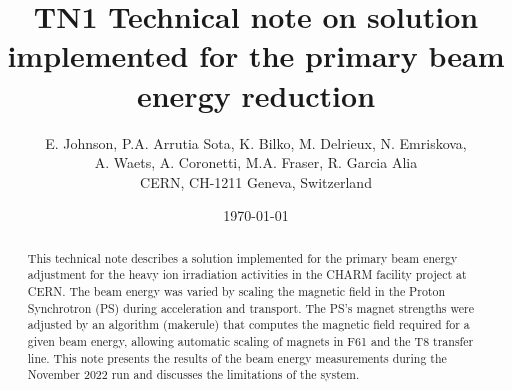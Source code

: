 \documentclass{cernatsnote}
\title{TN1 Technical note on solution implemented for the primary beam energy reduction}
\author{
	E. Johnson, P.A. Arrutia Sota, K. Bilko, M. Delrieux, N. Emriskova,\\ A. Waets, A. Coronetti,  M.A. Fraser, R. Garcia Alia\; \\		
	CERN, CH-1211 Geneva, Switzerland
}
\date{\today}
\begin{document}
\maketitle

\begin{abstract}
This technical note describes a solution implemented for the primary beam energy adjustment for the heavy ion irradiation activities in the CHARM facility project at CERN. The beam energy was varied by scaling the magnetic field in the Proton Synchrotron (PS) during acceleration and transport. The PS's magnet strengths were adjusted by an algorithm (makerule) that computes the magnetic field required for a given beam energy, allowing automatic scaling of magnets in F61 and the T8 transfer line. This note presents the results of the beam energy measurements during the November 2022 run and discusses the limitations of the system.
\end{abstract}
\\ \\ \\ 

\newpage
\end{document}
